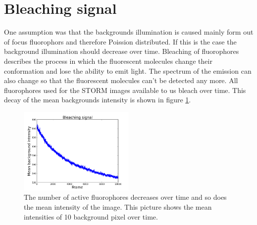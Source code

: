 \section{Bleaching signal}
One assumption was that the backgrounds illumination is caused mainly form out of focus fluorophors and therefore Poission distributed. If this is the case the background illumination should decrease over time. Bleaching of fluorophores describes the process in which the fluorescent molecules change their conformation and lose the ability to emit light. The spectrum of the emission can also change so that the fluorescent molecules can't be detected any more. All fluorophores used for the STORM images available to us bleach over time. This decay of the mean backgrounds intensity is shown in figure \ref{bleaching}.

\begin{figure}
\centering
\includegraphics[width = 0.5\textwidth]{pictures/bleaching.png}
	\caption{The number of active fluorophores decreases over time and so does the mean intensity of the image. This picture shows the mean intensities of 10 background pixel over time. }
	\label{bleaching}
\end{figure}